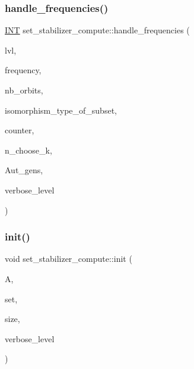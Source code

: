 \mbox{\label{classset__stabilizer__compute_a247c31bc3f19f22dadbfd7607cbaaa78}} 
\subsubsection{\texorpdfstring{handle\+\_\+frequencies()}{handle\_frequencies()}}
{\footnotesize\ttfamily \mbox{\hyperlink{galois_8h_a09fddde158a3a20bd2dcadb609de11dc}{I\+NT}} set\+\_\+stabilizer\+\_\+compute\+::handle\+\_\+frequencies (\begin{DoxyParamCaption}\item[{\mbox{\hyperlink{galois_8h_a09fddde158a3a20bd2dcadb609de11dc}{I\+NT}}}]{lvl,  }\item[{\mbox{\hyperlink{galois_8h_a09fddde158a3a20bd2dcadb609de11dc}{I\+NT}} $\ast$}]{frequency,  }\item[{\mbox{\hyperlink{galois_8h_a09fddde158a3a20bd2dcadb609de11dc}{I\+NT}}}]{nb\+\_\+orbits,  }\item[{\mbox{\hyperlink{galois_8h_a09fddde158a3a20bd2dcadb609de11dc}{I\+NT}} $\ast$}]{isomorphism\+\_\+type\+\_\+of\+\_\+subset,  }\item[{\mbox{\hyperlink{galois_8h_a09fddde158a3a20bd2dcadb609de11dc}{I\+NT}} \&}]{counter,  }\item[{\mbox{\hyperlink{galois_8h_a09fddde158a3a20bd2dcadb609de11dc}{I\+NT}}}]{n\+\_\+choose\+\_\+k,  }\item[{\mbox{\hyperlink{classstrong__generators}{strong\+\_\+generators}} $\ast$\&}]{Aut\+\_\+gens,  }\item[{\mbox{\hyperlink{galois_8h_a09fddde158a3a20bd2dcadb609de11dc}{I\+NT}}}]{verbose\+\_\+level }\end{DoxyParamCaption})}

\mbox{\label{classset__stabilizer__compute_a3ffab71fb628fd1c25694c1bb69a65fe}} 
\subsubsection{\texorpdfstring{init()}{init()}}
{\footnotesize\ttfamily void set\+\_\+stabilizer\+\_\+compute\+::init (\begin{DoxyParamCaption}\item[{\mbox{\hyperlink{classaction}{action}} $\ast$}]{A,  }\item[{\mbox{\hyperlink{galois_8h_a09fddde158a3a20bd2dcadb609de11dc}{I\+NT}} $\ast$}]{set,  }\item[{\mbox{\hyperlink{galois_8h_a09fddde158a3a20bd2dcadb609de11dc}{I\+NT}}}]{size,  }\item[{\mbox{\hyperlink{galois_8h_a09fddde158a3a20bd2dcadb609de11dc}{I\+NT}}}]{verbose\+\_\+level }\end{DoxyParamCaption})}

